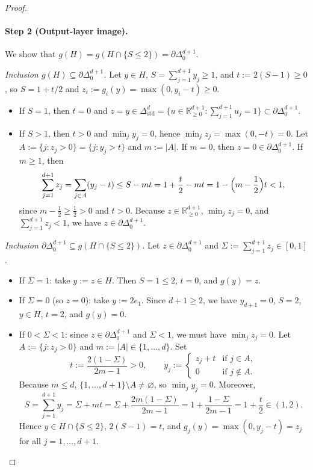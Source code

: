 \documentclass[11pt]{article}
\theoremstyle{plain}
\theoremstyle{definition}
\theoremstyle{remark}
\begin{document}
\begin{proof}
\paragraph{Step 2 (Output-layer image).}
We show that $g(H) = g(H \cap \{S \le 2\}) = \partial \Delta_0^{d+1}$.

\emph{Inclusion $g(H) \subseteq \partial \Delta_0^{d+1}$.}
Let $y \in H$, $S = \sum_{j=1}^{d+1} y_j \ge 1$, and $t := 2(S - 1) \ge 0$, so $S = 1 + t/2$ and $z_i := g_i(y) = \max(0, y_i - t) \ge 0$.
\begin{itemize}[leftmargin=2em]
\item If $S = 1$, then $t = 0$ and $z = y \in \Delta_{\mathrm{std}}^d = \{u \in \mathbb{R}_{\ge 0}^{d+1} : \sum_{j=1}^{d+1} u_j = 1\} \subset \partial \Delta_0^{d+1}$.
\item If $S > 1$, then $t > 0$ and $\min_j y_j = 0$, hence $\min_j z_j = \max(0, -t) = 0$. Let $A := \{j : z_j > 0\} = \{j : y_j > t\}$ and $m := |A|$. If $m = 0$, then $z = 0 \in \partial \Delta_0^{d+1}$. If $m \ge 1$, then
\[
\sum_{j=1}^{d+1} z_j = \sum_{j \in A} (y_j - t) \le S - m t = 1 + \frac{t}{2} - m t = 1 - \Bigl(m - \frac{1}{2}\Bigr) t < 1,
\]
since $m - \frac{1}{2} \ge \frac{1}{2} > 0$ and $t > 0$. Because $z \in \mathbb{R}_{\ge 0}^{d+1}$, $\min_j z_j = 0$, and $\sum_{j=1}^{d+1} z_j < 1$, we have $z \in \partial \Delta_0^{d+1}$.
\end{itemize}

\emph{Inclusion $\partial \Delta_0^{d+1} \subseteq g(H \cap \{S \le 2\})$.}
Let $z \in \partial \Delta_0^{d+1}$ and $\Sigma := \sum_{j=1}^{d+1} z_j \in [0, 1]$.
\begin{itemize}[leftmargin=2em]
\item If $\Sigma = 1$: take $y := z \in H$. Then $S = 1 \le 2$, $t = 0$, and $g(y) = z$.
\item If $\Sigma = 0$ (so $z = 0$): take $y := 2 e_1$. Since $d + 1 \ge 2$, we have $y_{d+1} = 0$, $S = 2$, $y \in H$, $t = 2$, and $g(y) = 0$.
\item If $0 < \Sigma < 1$: since $z \in \partial \Delta_0^{d+1}$ and $\Sigma < 1$, we must have $\min_j z_j = 0$. Let $A := \{j : z_j > 0\}$ and $m := |A| \in \{1, \dots, d\}$. Set
\[
t := \frac{2(1 - \Sigma)}{2m - 1} > 0, \qquad
y_j := \begin{cases} z_j + t & \text{if } j \in A, \\ 0 & \text{if } j \notin A. \end{cases}
\]
Because $m \le d$, $\{1, \dots, d+1\} \setminus A \neq \varnothing$, so $\min_j y_j = 0$. Moreover,
\[
S = \sum_{j=1}^{d+1} y_j = \Sigma + m t = \Sigma + \frac{2m(1 - \Sigma)}{2m - 1} = 1 + \frac{1 - \Sigma}{2m - 1} = 1 + \frac{t}{2} \in (1, 2).
\]
Hence $y \in H \cap \{S \le 2\}$, $2(S - 1) = t$, and $g_j(y) = \max(0, y_j - t) = z_j$ for all $j = 1, \dots, d+1$.
\end{itemize}


\end{proof}
\end{document}
